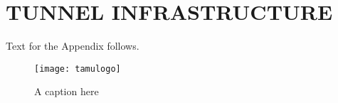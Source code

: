 %
%	 
%


\chapter{TUNNEL INFRASTRUCTURE}
\label{appendix:infrastructure}

Text for the Appendix follows.

\begin{figure}[ht]
    \centering
    \texttt{[image: tamulogo]}
    \caption{A caption here}
\end{figure}


